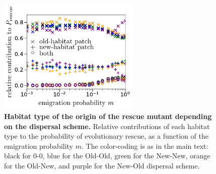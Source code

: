\documentclass[11pt]{article}
\begin{document}
\begin{figure}[h!]
	\centering
	\includegraphics[width=0.6\textwidth]{figS7.pdf}
	\caption{\textbf{Habitat type of the origin of the rescue mutant depending on the dispersal scheme.} Relative contributions of each habitat type to the probability of evolutionary rescue, as a function of the emigration probability $m$. The color-coding is as in the main text: black for 0-0, blue for the Old-Old, green for the New-New, orange for the Old-New, and purple for the New-Old dispersal scheme.}
	\label{Sfig:natal_habitat}
\end{figure}

%
%
\end{document}
